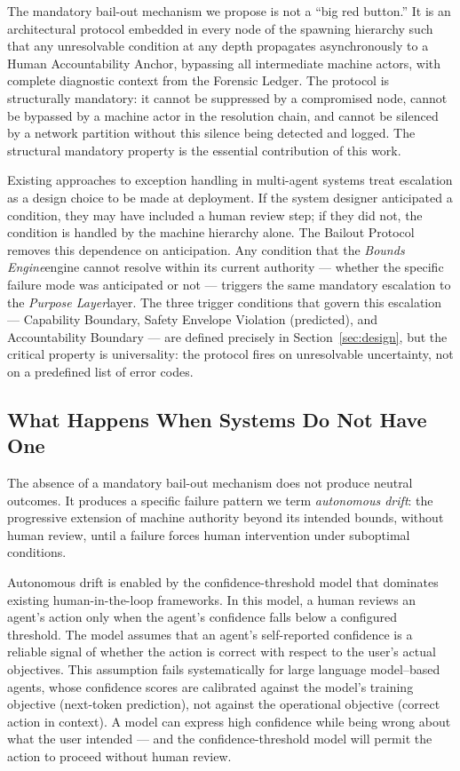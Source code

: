 \documentclass[12pt]{article}
\newcommand{\purpose}{\textit{Purpose Layer}}
\newcommand{\bounds}{\textit{Bounds Engine}}
\begin{document}
The mandatory bail-out mechanism we propose is not a ``big red button.'' It is an architectural protocol embedded in every node of the spawning hierarchy such that any unresolvable condition at any depth propagates asynchronously to a Human Accountability Anchor, bypassing all intermediate machine actors, with complete diagnostic context from the Forensic Ledger. The protocol is structurally mandatory: it cannot be suppressed by a compromised node, cannot be bypassed by a machine actor in the resolution chain, and cannot be silenced by a network partition without this silence being detected and logged. The structural mandatory property is the essential contribution of this work.

Existing approaches to exception handling in multi-agent systems treat escalation as a design choice to be made at deployment. If the system designer anticipated a condition, they may have included a human review step; if they did not, the condition is handled by the machine hierarchy alone. The Bailout Protocol removes this dependence on anticipation. Any condition that the \bounds engine cannot resolve within its current authority — whether the specific failure mode was anticipated or not — triggers the same mandatory escalation to the \purpose layer. The three trigger conditions that govern this escalation — Capability Boundary, Safety Envelope Violation (predicted), and Accountability Boundary — are defined precisely in Section~\ref{sec:design}, but the critical property is universality: the protocol fires on unresolvable uncertainty, not on a predefined list of error codes.

\subsection{What Happens When Systems Do Not Have One}

The absence of a mandatory bail-out mechanism does not produce neutral outcomes. It produces a specific failure pattern we term \textit{autonomous drift}: the progressive extension of machine authority beyond its intended bounds, without human review, until a failure forces human intervention under suboptimal conditions.

Autonomous drift is enabled by the confidence-threshold model that dominates existing human-in-the-loop frameworks. In this model, a human reviews an agent's action only when the agent's confidence falls below a configured threshold. The model assumes that an agent's self-reported confidence is a reliable signal of whether the action is correct with respect to the user's actual objectives. This assumption fails systematically for large language model--based agents, whose confidence scores are calibrated against the model's training objective (next-token prediction), not against the operational objective (correct action in context). A model can express high confidence while being wrong about what the user intended — and the confidence-threshold model will permit the action to proceed without human review.
\end{document}
